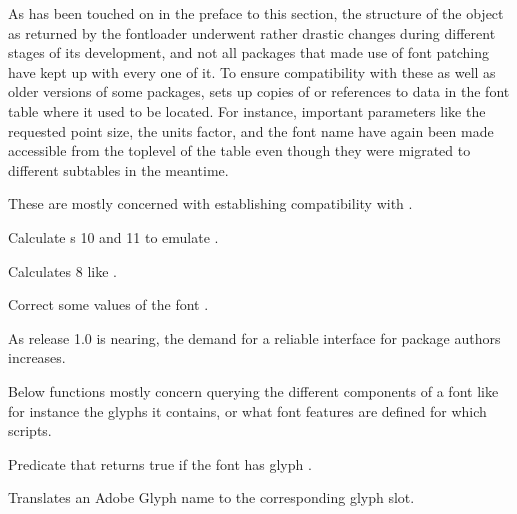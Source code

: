 
As has been touched on in the preface to this section, the structure
of the object as returned by the fontloader underwent rather drastic
changes during different stages of its development, and not all
packages that made use of font patching have kept up with every one
of it.
%
To ensure compatibility with these as well as older versions of
some packages,  sets up copies of or references
to data in the font table where it used to be located.
%
For instance, important parameters like the requested point size, the
units factor, and the font name have again been made accessible from
the toplevel of the table even though they were migrated to different
subtables in the meantime.

\endsubsubsection


These are mostly concerned with establishing compatibility with \XETEX.

\beginfunctionlist

            Calculate s 10 and 11 to emulate \XETEX.

            Calculates  8 like \XETEX.

            Correct some values of the font .

\endfunctionlist

\endsubsection


As \LUATEX release 1.0 is nearing, the demand for a reliable interface
for package authors increases.

\endsubsubsection


Below functions mostly concern querying the different components of a
font like for instance the glyphs it contains, or what font features
are defined for which scripts.

\beginfunctionlist

            Predicate that returns true if the font 
            has glyph .

            Translates an Adobe Glyph name to the corresponding glyph
            slot.

